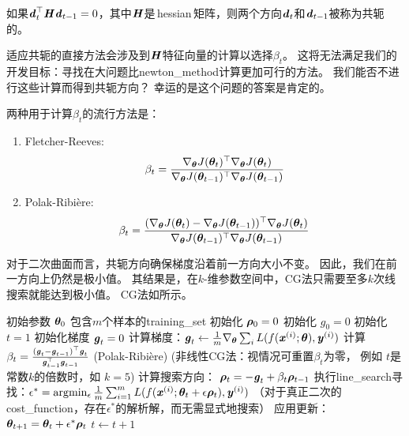 
如果$\boldsymbol{\mathit{d}}_t^\top \boldsymbol{\mathit{H}} \boldsymbol{\mathit{d}}_{t-1} = 0$，其中$\boldsymbol{\mathit{H}}$是\,\gls{hessian}\,矩阵，则两个方向$\boldsymbol{\mathit{d}}_t$和$\boldsymbol{\mathit{d}}_{t-1}$被称为共轭的。

适应共轭的直接方法会涉及到$\boldsymbol{\mathit{H}}$特征向量的计算以选择$\beta_t$。
这将无法满足我们的开发目标：寻找在大问题比\gls{newton_method}计算更加可行的方法。
我们能否不进行这些计算而得到共轭方向？
幸运的是这个问题的答案是肯定的。

两种用于计算$\beta_t$的流行方法是：
\begin{enumerate}
\item Fletcher-Reeves:
\begin{equation}
    \beta_t = \frac{ \nabla_{\boldsymbol{\theta}} J(\boldsymbol{\theta}_t)^\top \nabla_{\boldsymbol{\theta}} J(\boldsymbol{\theta}_t) }
{ \nabla_{\boldsymbol{\theta}} J(\boldsymbol{\theta}_{t-1})^\top \nabla_{\boldsymbol{\theta}} J(\boldsymbol{\theta}_{t-1}) }
\end{equation}

\item Polak-Ribi\`{e}re:
\begin{equation}
    \beta_t = \frac{ (\nabla_{\boldsymbol{\theta}} J(\boldsymbol{\theta}_t) - \nabla_{\boldsymbol{\theta}} J(\boldsymbol{\theta}_{t-1}))^\top \nabla_{\boldsymbol{\theta}} J(\boldsymbol{\theta}_t) }
{ \nabla_{\boldsymbol{\theta}} J(\boldsymbol{\theta}_{t-1})^\top \nabla_{\boldsymbol{\theta}} J(\boldsymbol{\theta}_{t-1}) }
\end{equation}
\end{enumerate}
对于二次曲面而言，共轭方向确保梯度沿着前一方向大小不变。
因此，我们在前一方向上仍然是极小值。
其结果是，在$k$-维参数空间中，\gls{CG}法只需要至多$k$次线搜索就能达到极小值。
\gls{CG}法如所示。

\begin{algorithm}[ht]
\caption{\gls{CG}法}
\label{alg:cg}
\begin{algorithmic}
\REQUIRE 初始参数 $\boldsymbol{\theta}_{0}$
\REQUIRE 包含$m$个样本的\gls{training_set}
\STATE 初始化 $\boldsymbol{\rho}_{0} = 0$
\STATE 初始化 $g_0 = 0$
\STATE 初始化 $t = 1$
    \STATE 初始化梯度 ${\boldsymbol{\mathit{g}}}_{t} = 0$
    \STATE 计算梯度：$\boldsymbol{\mathit{g}}_{t} \leftarrow
         \frac{1}{m}\nabla_{\boldsymbol{\theta}} \sum_i L(f(\boldsymbol{\mathit{x}}^{(i)};\boldsymbol{\theta}),\boldsymbol{\mathit{y}}^{(i)})$ 
    \STATE 计算 $\beta_{t} = \frac{(\boldsymbol{\mathit{g}}_{t}-\boldsymbol{\mathit{g}}_{t-1})^\top \boldsymbol{\mathit{g}}_{t}}{\boldsymbol{\mathit{g}}_{t-1}^\top \boldsymbol{\mathit{g}}_{t-1}}$  (Polak-Ribi\`{e}re)
    \STATE (非线性\gls{CG}法：视情况可重置$\beta_{t}$为零，
           例如  $t$是常数$k$的倍数时，如 $k=5$)
    \STATE 计算搜索方向： $\boldsymbol{\rho}_{t} = -\boldsymbol{\mathit{g}}_{t} + \beta_{t} \boldsymbol{\rho}_{t-1}$ 
    \STATE 执行\gls{line_search}寻找：$\epsilon^{*} = \arg\!\min_{\epsilon}
    \frac{1}{m} \sum_{i=1}^{m}L(f(\boldsymbol{\mathit{x}}^{(i)};\boldsymbol{\theta}_t + \epsilon \boldsymbol{\rho}_t),\boldsymbol{\mathit{y}}^{(i)})$ 
    \STATE （对于真正二次的\gls{cost_function}，存在$\epsilon^*$的解析解，而无需显式地搜索）
    \STATE 应用更新：$\boldsymbol{\theta}_{t+1} = \boldsymbol{\theta}_{t}+ \epsilon^{*} \boldsymbol{\rho}_{t}$
    \STATE $t \leftarrow t + 1$
\ENDWHILE
\end{algorithmic}
\end{algorithm}


